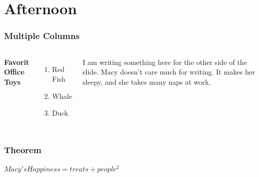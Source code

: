 \documentclass[12pt]{beamer}\usepackage[]{graphicx}\usepackage[]{color}
\begin{document}
\section{Afternoon}


\begin{frame}
\frametitle{Multiple Columns}
\begin{columns}[t] %

\textbf{Favorit Office Toys}
\begin{enumerate}
\item Red Fish
\item Whale
\item Duck
\end{enumerate}

I am writing something here for the other side of the slide. Macy doesn't care much for writing. It makes her sleepy, and she takes many naps at work.

\end{columns}
\end{frame}

\begin{frame}
\frametitle{Theorem}
\begin{theorem}
$Macy's Happiness = treats + people^2$
\end{theorem}
\end{frame}
\end{document}
